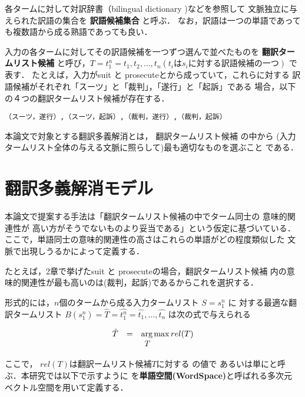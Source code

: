   各タームに対して対訳辞書（bilingual dictionary )などを参照して
文脈独立に与えられた訳語の集合を  {\bf 訳語候補集合} と呼ぶ． 
なお，訳語は一つの単語であっても複数語から成る熟語であっても良い．

  入力の各タームに対してその訳語候補を一つずつ選んで並べたものを
{\bf 翻訳タームリスト候補} と呼び，$T = t_1^n = t_1, t_2, \ldots, t_n (t_i は
s_i に対する訳語候補の一つ)$ で表す． たとえば，入力がsuit と 
prosecuteとから成っていて，これらに対する
訳語候補がそれぞれ「スーツ」と「裁判」，「遂行」と「起訴」である
場合，以下の４つの翻訳タームリスト候補が存在する．

\begin{verbatim}
（スーツ，遂行）,（スーツ，起訴）,（裁判，遂行）,（裁判，起訴）
\end{verbatim}

  本論文で対象とする翻訳多義解消とは， 翻訳タームリスト候補 の中から
(入力タームリスト全体の与える文脈に照らして)最も適切なものを選ぶこと
である． 

\section{翻訳多義解消モデル}

  本論文で提案する手法は「翻訳タームリスト候補の中でターム同士の
意味的関連性が
高い方がそうでないものより妥当である」という仮定に基づいている．
ここで，単語同士の意味的関連性の高さはこれらの単語がどの程度類似した
文脈で出現しうるかによって定義する．

たとえば，2章で挙げたsuit と prosecuteの場合，翻訳タームリスト候補
内の意味的関連性が最も高いのは(裁判，起訴)であるからこれを選択する．

形式的には，$ n$個のタームから成る入力タームリスト $ S = s_1^n $ に
対する最適な翻訳タームリスト $ B(s_1^n) = \hat{T}= \hat{t_1^n} = 
\hat{t_1}, \ldots, \hat{t_n}$ は次の式で与えられる


\vspace{5mm}

\renewcommand{\arraystretch}{}
\[
\begin{array}{cccc}
\hat{T} & = & \arg & \hspace{-3mm} \max rel(T) \nonumber \\
	&   & {\it T} & \nonumber
\end{array}
\]

\renewcommand{\arraystretch}{}

ここで，
$ rel(T) $は翻訳ームリスト候補$ T$に対する \ikanren の値で {\bf 
\ikd }あるいは単に{\bf \kd }と呼ぶ．本研究では以下で示すように 
\ikd を{\bf 単語空間(WordSpace\cite{Schuetze97})}と呼ばれる多次元
ベクトル空間を用いて定義する．

